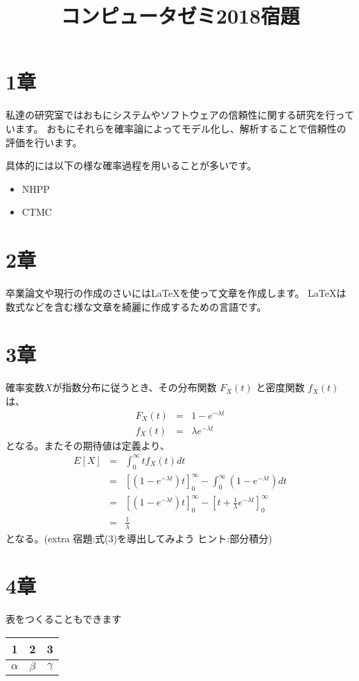 \documentclass[a4paper,12pt]{article}
\begin{document}
\title{コンピュータゼミ2018宿題}
\date{}
\maketitle
\section{1章}
私達の研究室ではおもにシステムやソフトウェアの信頼性に関する研究を行っています。
おもにそれらを確率論によってモデル化し、解析することで信頼性の評価を行います。

具体的には以下の様な確率過程を用いることが多いです。

\begin{itemize}
\item NHPP
\item CTMC
\end{itemize}

\section{2章}
卒業論文や現行の作成のさいには\LaTeX を使って文章を作成します。
\LaTeX は数式などを含む様な文章を綺麗に作成するための言語です。

\section{3章}
確率変数$X$が指数分布に従うとき、その分布関数 $F_X(t)$ と密度関数 $f_X(t)$ は、
\begin{eqnarray}
F_X(t) &=& 1 - e^{- \lambda t}\\
f_X(t) &=& \lambda e^{- \lambda t}
\end{eqnarray}
となる。またその期待値は定義より、
\begin{eqnarray}
E[X] &=& \int_0^{\infty} tf_X(t) dt\nonumber \\
&=& [(1-e^{- \lambda t})t]_0^{\infty}-\int_0^{\infty}(1-e^{-\lambda t}) dt\nonumber \\
&=& [(1-e^{- \lambda t})t]_0^{\infty}-[t+\frac{1}{\lambda} e^{-\lambda t}]_0^{\infty}\nonumber \\
&=& \frac{1}{\lambda}
\end{eqnarray}
となる。(extra 宿題:式(3)を導出してみよう ヒント:部分積分)

\section{4章}
表をつくることもできます
\begin{table}[htb]
\begin{center}
    \begin{tabular}{|c|c|c|} \hline
    1 & 2 & 3 \\ \hline
    $\alpha$ & $\beta$ & $\gamma$ \\ \hline
    \end{tabular}
\end{center}
\end{table}
\end{document}
